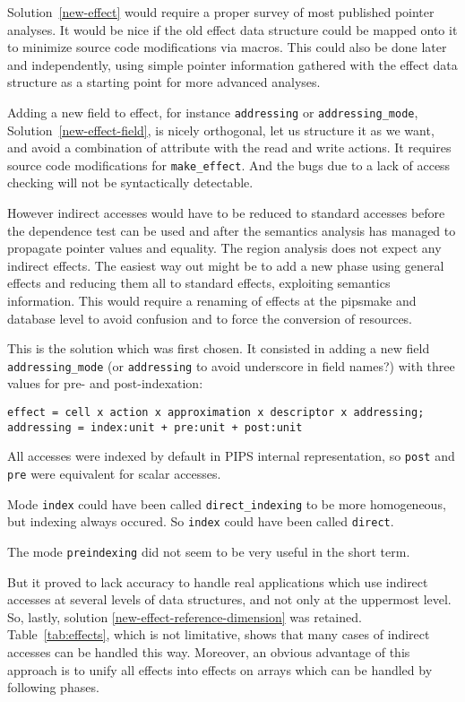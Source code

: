 \documentclass[a4paper]{report}
\begin{document}
Solution~\ref{new-effect} would require a proper
 survey of most published pointer analyses. It would be nice if the
 old effect data structure could be mapped onto it to minimize source
 code modifications via macros. This could also be done later and
 independently, using simple pointer information gathered with the
 effect data structure as a starting point for more advanced analyses.


Adding a new field to effect, for instance \verb/addressing/ or
 \verb/addressing_mode/, Solution~\ref{new-effect-field}, is nicely
 orthogonal, let us structure it as we want, and avoid a combination
 of attribute with the read and write actions. It requires source code
 modifications for \verb/make_effect/. And the bugs due to a lack of
 access checking will not be syntactically detectable.

However indirect accesses would have to be reduced to standard
 accesses before the dependence test can be used and after the
 semantics analysis has managed to propagate pointer values and
 equality. The region analysis does not expect any indirect
 effects. The easiest way out might be to add a new phase using
 general effects and reducing them all to standard effects, exploiting
 semantics information. This would require a renaming of effects at
 the pipsmake and database level to avoid confusion and to force the
 conversion of resources.

This is the solution which was first chosen. It consisted in adding a new field
 \verb/addressing_mode/ (or \verb/addressing/ to avoid underscore in
 field names?) with three values for pre- and post-indexation:

\begin{verbatim}
effect = cell x action x approximation x descriptor x addressing;
addressing = index:unit + pre:unit + post:unit
\end{verbatim}

All accesses were indexed by default in PIPS internal representation,
 so \verb/post/ and \verb/pre/ were equivalent for scalar accesses.

Mode \verb/index/ could have been called \verb/direct_indexing/ to be more
 homogeneous, but indexing always occured. So \verb/index/ could have been
 called \verb/direct/.

The mode \verb/preindexing/ did not seem to be very useful in the
 short term.


But it proved to lack accuracy to handle real applications which use indirect accesses at several levels of data structures, and not only at the uppermost level. So, lastly, solution \ref{new-effect-reference-dimension} was retained. Table~\ref{tab:effects}, which is not limitative, shows that many cases of indirect accesses can be handled this way. Moreover, an obvious advantage of this approach is to unify all effects into effects on arrays which can be handled by following phases. 
\end{document}
